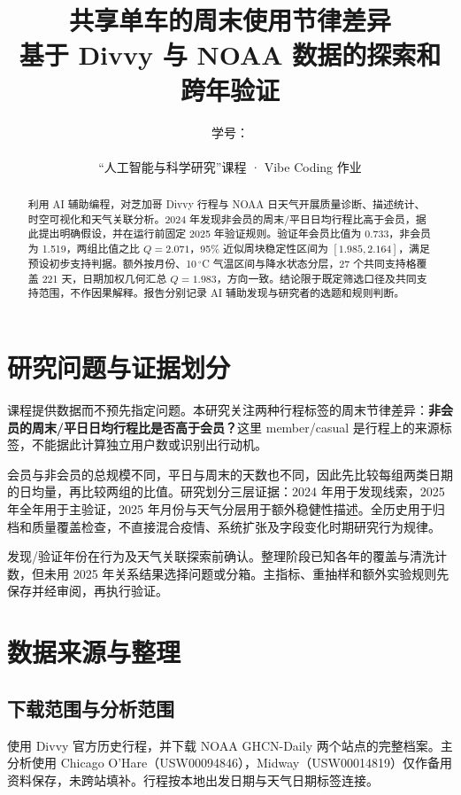 \documentclass[UTF8,fontset=fandol,a4paper,zihao=-4]{ctexart}
\title{共享单车的周末使用节律差异\\[0.4em]
  \large 基于 Divvy 与 NOAA 数据的探索和跨年验证}
\author{\StudentName\quad 学号：\StudentID\\\StudentUnit\\“人工智能与科学研究”课程 · Vibe Coding 作业}
\date{} %
\begin{document}
\maketitle

\begin{abstract}
利用 AI 辅助编程，对芝加哥 Divvy 行程与 NOAA 日天气开展质量诊断、描述统计、时空可视化和天气关联分析。2024 年发现非会员的周末/平日日均行程比高于会员，据此提出明确假设，并在运行前固定 2025 年验证规则。验证年会员比值为 0.733，非会员为 1.519，两组比值之比 $Q=2.071$，95\% 近似周块稳定性区间为 $[1.985,2.164]$，满足预设初步支持判据。额外按月份、10\,$^\circ$C 气温区间与降水状态分层，27 个共同支持格覆盖 221 天，日期加权几何汇总 $Q=1.983$，方向一致。结论限于既定筛选口径及共同支持范围，不作因果解释。报告分别记录 AI 辅助发现与研究者的选题和规则判断。
\end{abstract}

\section{研究问题与证据划分}

课程提供数据而不预先指定问题。本研究关注两种行程标签的周末节律差异：\textbf{非会员的周末/平日日均行程比是否高于会员？}这里 member/casual 是行程上的来源标签，不能据此计算独立用户数或识别出行动机。

会员与非会员的总规模不同，平日与周末的天数也不同，因此先比较每组两类日期的日均量，再比较两组的比值。研究划分三层证据：2024 年用于发现线索，2025 年全年用于主验证，2025 年月份与天气分层用于额外稳健性描述。全历史用于归档和质量覆盖检查，不直接混合疫情、系统扩张及字段变化时期研究行为规律。

发现/验证年份在行为及天气关联探索前确认。整理阶段已知各年的覆盖与清洗计数，但未用 2025 年关系结果选择问题或分箱。主指标、重抽样和额外实验规则先保存并经审阅，再执行验证\cite{repo}。

\section{数据来源与整理}

\subsection{下载范围与分析范围}

使用 Divvy 官方历史行程\cite{divvy}，并下载 NOAA GHCN-Daily 两个站点的完整档案\cite{noaa}。主分析使用 Chicago O'Hare（USW00094846），Midway（USW00014819）仅作备用资料保存，未跨站填补。行程按本地出发日期与天气日期标签连接。
\end{document}
